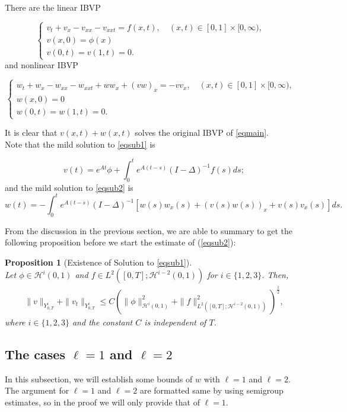 \documentclass[10pt,a4paper,final]{article}
\numberwithin{equation}{section}
\newtheorem{prop}[theorem]{Proposition}
\newcommand{\cH}{\mathcal{H}}
\begin{document}
 There are the linear IBVP

\begin{equation}\label{eqsub1}
\begin{cases}
    v_t+v_x-v_{xx}-v_{xxt}=f(x,t),  \quad (x, t)\in [0,1]\times [0, \infty),&\\
    v(x,0)=\phi(x) &\\
    v(0,t)=v(1,t)=0.&
    \end{cases}
\end{equation}
and nonlinear IBVP

\begin{equation}\label{eqsub2}
\begin{cases}
    w_t+w_x-w_{xx}-w_{xxt}+ww_x+(vw)_x=-vv_x,  \quad (x, t)\in [0,1]\times [0, \infty),&\\
    w(x,0)=0&\\
    w(0,t)=w(1,t)=0.&
    \end{cases}
\end{equation}

It is clear that $v(x,t)+w(x,t)$ solves the original IBVP of \eqref{eqmain}. \\

Note that the mild solution to \eqref{eqsub1} is 

$$v(t)=e^{At}\phi+\int_0^t e^{A(t-s)}(I-\Delta)^{-1}f(s)ds;$$
and the mild solution to \eqref{eqsub2} is
$$w(t)=-\int_0^t e^{A(t-s)}(I-\Delta)^{-1}[w(s)w_x(s)+(v(s)w(s))_x+v(s)v_x(s)]ds.$$

From the discussion in the previous section, we are able to summary to get the following proposition before we start the estimate of (\ref{eqsub2}):  

\begin{prop}[Existence of Solution to \eqref{eqsub1}]\label{existsub1}\ \\
    Let $\phi \in \cH^i(0,1)$ and $f\in L^{2}([0,T];\cH^{i-2}(0,1))$ for $i\in\{1,2,3\}$. Then,
    \begin{align*}
        \|v\|_{Y^{i}_{0,T}}+\|v_t\|_{Y^{i}_{0,T}}\leq C(\|\phi\|_{\cH^i(0,1)}^2+\|f\|^2_{L^2([0,T];\cH^{i-2}(0,1))})^{\frac{1}{2}},
    \end{align*}
    where $i\in \{1,2,3\}$ and the constant $C$ is independent of $T$.
\end{prop}
\subsection{The cases $\ell=1$ and $\ell=2$}
In this subsection, we will establish some bounds of $w$ with $\ell=1$ and $\ell=2$. The argument for $\ell=1$ and $\ell=2$ are formatted same by using semigroup estimates, so in the proof we will only provide that of $\ell=1$. 
\end{document}
